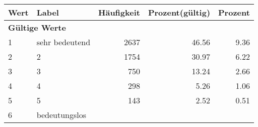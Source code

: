      \begin{longtable}{lXrrr}
     \toprule
     \textbf{Wert} & \textbf{Label} & \textbf{Häufigkeit} & \textbf{Prozent(gültig)} & \textbf{Prozent} \\
     \endhead
     \midrule
     \multicolumn{5}{l}{\textbf{Gültige Werte}}\\

     1 &
     \multicolumn{1}{X}{ sehr bedeutend   } &


       \num{2637} &
       \num[round-mode=places,round-precision=2]{46.56} &
         \num[round-mode=places,round-precision=2]{9.36} \\

     2 &
     \multicolumn{1}{X}{ 2   } &


       \num{1754} &
       \num[round-mode=places,round-precision=2]{30.97} &
         \num[round-mode=places,round-precision=2]{6.22} \\

     3 &
     \multicolumn{1}{X}{ 3   } &


       \num{750} &
       \num[round-mode=places,round-precision=2]{13.24} &
         \num[round-mode=places,round-precision=2]{2.66} \\

     4 &
     \multicolumn{1}{X}{ 4   } &


       \num{298} &
       \num[round-mode=places,round-precision=2]{5.26} &
         \num[round-mode=places,round-precision=2]{1.06} \\

     5 &
     \multicolumn{1}{X}{ 5   } &


       \num{143} &
       \num[round-mode=places,round-precision=2]{2.52} &
         \num[round-mode=places,round-precision=2]{0.51} \\

     6 &
     \multicolumn{1}{X}{ bedeutungslos   } &



\end{longtable}
